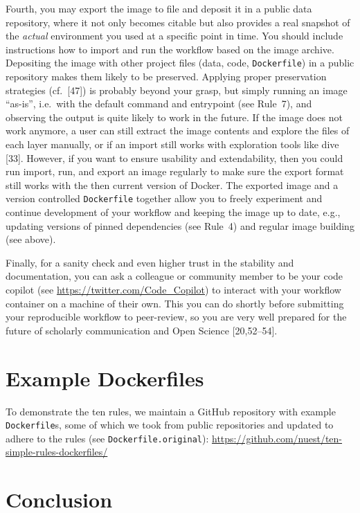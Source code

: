 \documentclass[10pt,letterpaper]{article}
\begin{document}
Fourth, you may export the image to file and deposit it in a public data
repository, where it not only becomes citable but also provides a real
snapshot of the \emph{actual} environment you used at a specific point
in time. You should include instructions how to import and run the
workflow based on the image archive. Depositing the image with other
project files (data, code, \texttt{Dockerfile}) in a public repository
makes them likely to be preserved. Applying proper preservation
strategies (cf.~{[}47{]}) is probably beyond your grasp, but simply
running an image ``as-is'', i.e.~with the default command and entrypoint
(see Rule~7), and observing the output is quite likely to work in the
future. If the image does not work anymore, a user can still extract the
image contents and explore the files of each layer manually, or if an
import still works with exploration tools like dive {[}33{]}. However,
if you want to ensure usability and extendability, then you could run
import, run, and export an image regularly to make sure the export
format still works with the then current version of Docker. The exported
image and a version controlled \texttt{Dockerfile} together allow you to
freely experiment and continue development of your workflow and keeping
the image up to date, e.g., updating versions of pinned dependencies
(see Rule~4) and regular image building (see above).

Finally, for a sanity check and even higher trust in the stability and
documentation, you can ask a colleague or community member to be your
code copilot (see \url{https://twitter.com/Code_Copilot}) to interact
with your workflow container on a machine of their own. This you can do
shortly before submitting your reproducible workflow to peer-review, so
you are very well prepared for the future of scholarly communication and
Open Science {[}20,52--54{]}.

\hypertarget{example-dockerfiles}{%
\section{Example Dockerfiles}\label{example-dockerfiles}}

To demonstrate the ten rules, we maintain a GitHub repository with
example \texttt{Dockerfile}s, some of which we took from public
repositories and updated to adhere to the rules (see
\texttt{Dockerfile.original}):
\url{https://github.com/nuest/ten-simple-rules-dockerfiles/}

\hypertarget{conclusion}{%
\section*{Conclusion}\label{conclusion}}
\end{document}

